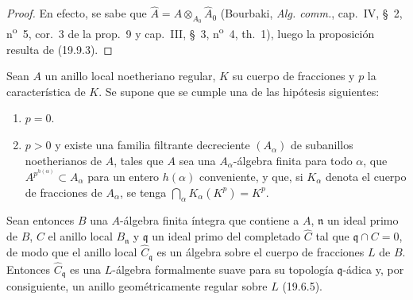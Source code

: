 \begin{proof}
En efecto, se sabe que
$\widehat A=A\otimes_{A_0}\widehat A_0$ (Bourbaki,
\emph{Alg. comm.}, cap.~IV, §~2, n\textsuperscript{o}~5, cor.~3 de la
prop.~9 y cap.~III, §~3, n\textsuperscript{o}~4, th.~1), luego la proposición
resulta de (19.9.3).
\end{proof}

\begin{proposition}[22.3.2]
\label{0.22.3.2-fr}
Sean $A$ un anillo local noetheriano regular, $K$ su cuerpo de fracciones y
$p$ la característica de $K$. Se supone que se cumple una de las hipótesis
siguientes:
\begin{enumerate}
  \item[\textup{(i)}] $p=0$.
  \item[\textup{(ii)}] $p>0$ y existe una familia filtrante decreciente $(A_\alpha)$
  de subanillos noetherianos de $A$, tales que $A$ sea una
  $A_\alpha$-álgebra finita para todo $\alpha$, que
  $A^{p^{h(\alpha)}}\subset A_\alpha$ para un entero $h(\alpha)$ conveniente,
  y que, si $K_\alpha$ denota el cuerpo de fracciones de $A_\alpha$, se tenga
  $\bigcap_\alpha K_\alpha(K^p)=K^p$.
\end{enumerate}
Sean entonces $B$ una $A$-álgebra finita íntegra que contiene a $A$,
$\mathfrak n$ un ideal primo de $B$, $C$ el anillo local $B_\mathfrak n$ y
$\mathfrak q$ un ideal primo del completado $\widehat C$ tal que
$\mathfrak q\cap C=0$, de modo que el anillo local
$\widehat C_\mathfrak q$ es un álgebra sobre el cuerpo de fracciones $L$ de
$B$. Entonces $\widehat C_\mathfrak q$ es una $L$-álgebra formalmente suave
para su topología $\mathfrak q$-ádica y, por consiguiente, un anillo
geométricamente regular sobre $L$ \textup{(19.6.5)}.
\end{proposition}

